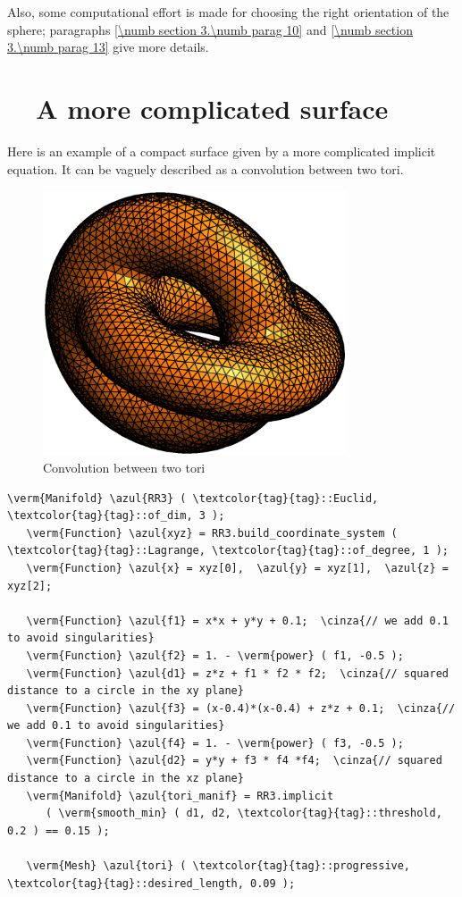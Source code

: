 Also, some computational effort is made for choosing the right orientation of the sphere;
paragraphs \ref{\numb section 3.\numb parag 10} and \ref{\numb section 3.\numb parag 13}
give more details.


\section{~~A more complicated surface}\label{\numb section 3.\numb parag 7}

Here is an example of a compact surface given by a more complicated implicit equation.
It can be vaguely described as a convolution between two tori.

\begin{figure}[ht] \centering
 \includegraphics[width=90mm]{two-tori}
  \caption{Convolution between two tori}
\end{figure}

\begin{Verbatim}[commandchars=\\\{\},formatcom=\small\tt,frame=single,
   label=parag-\ref{\numb section 3.\numb parag 7}.cpp,rulecolor=\color{coment},
   baselinestretch=0.94,framesep=2mm                                            ]
   \verm{Manifold} \azul{RR3} ( \textcolor{tag}{tag}::Euclid, \textcolor{tag}{tag}::of_dim, 3 );
   \verm{Function} \azul{xyz} = RR3.build_coordinate_system ( \textcolor{tag}{tag}::Lagrange, \textcolor{tag}{tag}::of_degree, 1 );
   \verm{Function} \azul{x} = xyz[0],  \azul{y} = xyz[1],  \azul{z} = xyz[2];

   \verm{Function} \azul{f1} = x*x + y*y + 0.1;  \cinza{// we add 0.1 to avoid singularities}
   \verm{Function} \azul{f2} = 1. - \verm{power} ( f1, -0.5 );
   \verm{Function} \azul{d1} = z*z + f1 * f2 * f2;  \cinza{// squared distance to a circle in the xy plane}
   \verm{Function} \azul{f3} = (x-0.4)*(x-0.4) + z*z + 0.1;  \cinza{// we add 0.1 to avoid singularities}
   \verm{Function} \azul{f4} = 1. - \verm{power} ( f3, -0.5 );
   \verm{Function} \azul{d2} = y*y + f3 * f4 *f4;  \cinza{// squared distance to a circle in the xz plane}
   \verm{Manifold} \azul{tori_manif} = RR3.implicit
      ( \verm{smooth_min} ( d1, d2, \textcolor{tag}{tag}::threshold, 0.2 ) == 0.15 );

   \verm{Mesh} \azul{tori} ( \textcolor{tag}{tag}::progressive, \textcolor{tag}{tag}::desired_length, 0.09 );
\end{Verbatim}

